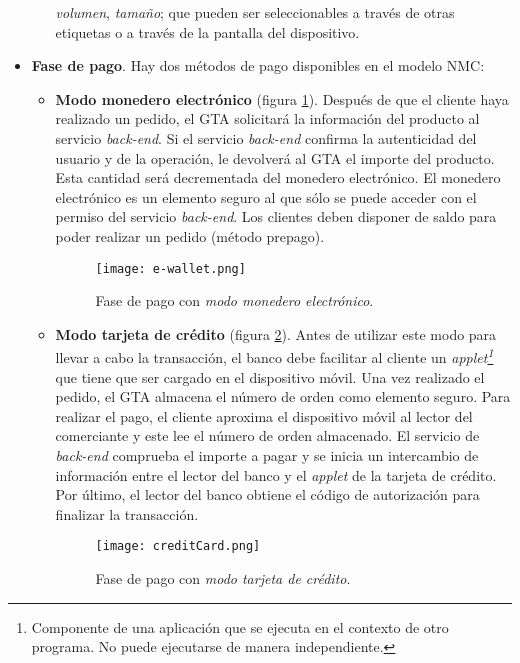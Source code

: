 \begin{itemize}
\begin{itemize}
    \emph{volumen}, \emph{tamaño}; que pueden ser seleccionables a través
    de otras etiquetas o a través de la pantalla del dispositivo.
    \end{itemize}
  \item \textbf{Fase de pago}. Hay dos métodos de pago disponibles en el
  modelo \acs{NMC}:
    \begin{itemize}
    \item \textbf{Modo monedero electrónico} (figura \ref{fig:e-wallet}). 
    Después de que el cliente haya realizado un pedido, el \acs{GTA} 
    solicitará la información del producto al servicio \emph{back-end}. Si el 
    servicio \emph{back-end} confirma la autenticidad del usuario y de la 
    operación, le devolverá al \acs{GTA} el importe del producto. Esta 
    cantidad será decrementada del monedero electrónico. El monedero 
    electrónico es un elemento seguro al que sólo se puede acceder con el 
    permiso del servicio \emph{back-end}. Los clientes deben disponer de saldo 
    para poder realizar un pedido (método prepago).

    \begin{figure}[!h]
      \begin{center}
        \texttt{[image: e-wallet.png]}
        \caption{Fase de pago con \emph{modo monedero electrónico}.}
        \label{fig:e-wallet}
      \end{center}
    \end{figure}

    \item \textbf{Modo tarjeta de crédito} (figura \ref{fig:creditCard}). 
    Antes de utilizar este modo para llevar a cabo la transacción, el banco 
    debe facilitar al cliente un \emph{applet\footnote{Componente de una 
    aplicación que se ejecuta en el contexto de otro programa. No puede 
    ejecutarse de manera independiente.}} que tiene que ser cargado en el 
    dispositivo móvil. Una vez realizado el pedido, el \acs{GTA} almacena el 
    número de orden como elemento seguro. Para realizar el pago, el cliente 
    aproxima el dispositivo móvil al lector del comerciante y este lee el 
    número de orden almacenado. El servicio de \emph{back-end} comprueba el 
    importe a pagar y se inicia un intercambio de información entre el lector 
    del banco y el \emph{applet} de la tarjeta de crédito. Por último, el 
    lector del banco obtiene el código de autorización para finalizar la 
    transacción.
  
    \begin{figure}[!h]
      \begin{center}
        \texttt{[image: creditCard.png]}
        \caption{Fase de pago con \emph{modo tarjeta de crédito}.}
        \label{fig:creditCard}
      \end{center}
    \end{figure}


\end{itemize}
\end{itemize}
